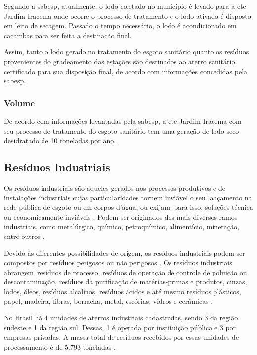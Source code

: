 	Segundo a \gls{sabesp}, atualmente, o lodo coletado no município é levado para a \gls{ete} Jardim Iracema onde ocorre o processo de tratamento e o lodo ativado é disposto em leito de secagem. Passado o tempo necessário, o lodo é acondicionado em caçambas para ser feita a destinação final.
	
	Assim, tanto o lodo gerado no tratamento do esgoto sanitário quanto os resíduos provenientes do gradeamento das estações são destinados ao aterro sanitário certificado para sua disposição final, de acordo com informações concedidas pela \gls{sabesp}. 
	
	\subsubsection{Volume}
	De acordo com informações levantadas pela \gls{sabesp}, a \gls{ete} Jardim Iracema com seu processo de tratamento do esgoto sanitário tem uma geração de lodo seco desidratado de 10 toneladas por ano.
	
	\subsection{Resíduos Industriais}
	
	Os resíduos industriais são aqueles gerados nos processos produtivos e de instalações industriais cujas particularidades tornem inviável o seu lançamento na rede pública de esgoto ou em corpos d’água, ou exijam, para isso, soluções técnica ou economicamente inviáveis \cite{brasil:12305, conama:313}. Podem ser originados dos mais diversos ramos industriais, como metalúrgico, químico, petroquímico, alimentício, mineração, entre outros \cite{IPEA2012b}.
	
	Devido às diferentes possibilidades de origem, os resíduos industriais podem ser compostos por resíduos perigosos ou não perigosos \cite{conama:313}. Os resíduos industriais abrangem resíduos de processo, resíduos de operação de controle de poluição ou descontaminação, resíduos da purificação de matérias-primas e produtos, cinzas, lodos, óleos, resíduos alcalinos, resíduos ácidos e até mesmo resíduos plásticos, papel, madeira, fibras, borracha, metal, escórias, vidros e cerâmicas \cite{IPEA2012b}.
	
	No Brasil há 4 unidades de aterros industriais cadastradas, sendo 3 da região sudeste e 1 da região sul. Dessas, 1 é operada por instituição pública e 3 por empresas privadas. A massa total de resíduos recebidos por essas unidades de processamento é de 5.793 toneladas \cite{SNIS2016}.
	
